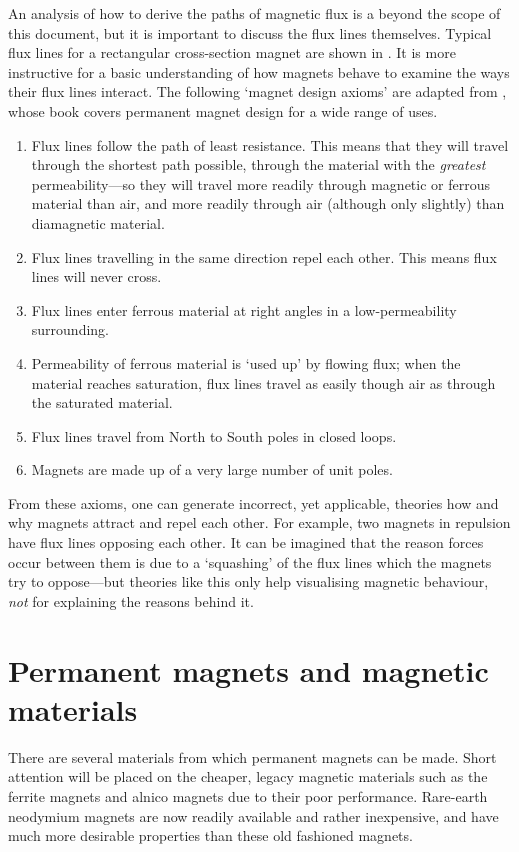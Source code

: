 \documentclass[11pt,a4paper]{memoir}
\begin{document}
An analysis of how to derive the paths of magnetic flux is a beyond the scope of this document, but it is important to discuss the flux lines themselves.
Typical flux lines for a rectangular cross-section magnet are shown in .
It is more instructive for a basic understanding of how magnets behave to examine the ways their flux lines interact.
The following `magnet
design axioms' are adapted from \textcite{moskowitz1995}, whose book
covers permanent magnet design for a wide range of uses.
\begin{enumerate}
\item Flux lines follow the path of least resistance. This means that they will
travel through the shortest path possible,
through the material with the
\emph{greatest} permeability---so they will travel more readily through
magnetic or ferrous material than air, and more readily through air
(although only slightly) than diamagnetic material.
\item Flux lines travelling in the same direction repel each other. This means
flux lines will never cross.
\item Flux lines enter ferrous material at right angles in a low-permeability surrounding.
\item Permeability of ferrous material is `used up' by flowing flux; when the
material reaches saturation, flux lines travel as easily though air as through
the saturated material.
\item Flux lines travel from North to South poles in closed loops.
\item Magnets are made up of a very large number of unit poles.
\end{enumerate}
From these axioms, one can generate incorrect, yet applicable,
theories how and why magnets attract and repel each other. For
example, two magnets in repulsion have flux lines opposing each
other.
It can be imagined that the reason forces occur between them is
due to a `squashing' of the flux lines which the magnets try to
oppose---but theories like this only help visualising magnetic
behaviour, \emph{not} for explaining the reasons behind it.

\section{Permanent magnets and magnetic materials}

There are several materials from which permanent magnets can be
made. Short attention will be placed on the cheaper, legacy magnetic
materials such as the ferrite magnets and alnico magnets due to their
poor performance. Rare-earth neodymium magnets are now readily
available and rather inexpensive, and have much more desirable properties
than these old fashioned magnets.
\end{document}
